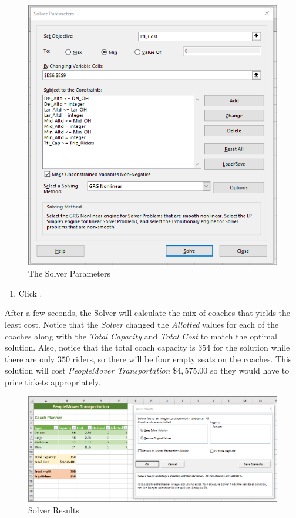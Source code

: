 \begin{figure}[H]
	\centering
	\includegraphics[width=\maxwidth{.95\linewidth}]{gfx/ch08_fig73}
	\caption{The Solver Parameters}
	\label{08:fig73}
\end{figure}

\begin{enumerate}[resume]	 
	 \item Click .
\end{enumerate}

After a few seconds, the Solver will calculate the mix of coaches that yields the least cost. Notice that the \textit{Solver} changed the \textit{Allotted} values for each of the coaches along with the \textit{Total Capacity} and \textit{Total Cost} to match the optimal solution. Also, notice that the total coach capacity is $ 354 $ for the solution while there are only $ 350 $ riders, so there will be four empty seats on the coaches. This solution will cost \textit{PeopleMover Transportation} \$$ 4,575.00 $ so they would have to price tickets appropriately.

\begin{figure}[H]
	\centering
	\includegraphics[width=\maxwidth{.95\linewidth}]{gfx/ch08_fig74}
	\caption{Solver Results}
	\label{08:fig74}
\end{figure}

